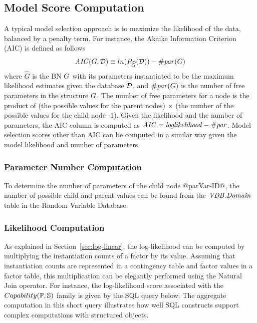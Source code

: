 \documentclass{IEEEtran}
\begin{document}
\subsection{Model Score Computation} \label{sec:model-score}
A typical model selection approach is to maximize the likelihood of the data, balanced by a penalty term. For instance, the Akaike Information Criterion (AIC) is defined as follows %
\[
\mathit{AIC}(\G,\D) \equiv ln(P_{\widehat{G}}(\D)) - \parameters(\G) \]
where $\widehat{G}$ is the BN $\G$ with its parameters instantiated to be the maximum likelihood estimates given the database $\D$, and $\parameters(\G)$ is the number of free parameters in the structure $\G$. 
The number of free parameters for a node is the product of (the possible values for the parent nodes) $\times$ (the number of the possible values for the child node -1). Given the likelihood and the number of parameters, the AIC column is computed as $\aic = \loglikelihood - \parameters$. 
 Model selection scores other than AIC can be computed in a similar way given the model likelihood and number of parameters.

\subsubsection{Parameter Number Computation} To determine the number of parameters of the child node @parVar-ID@, the number of possible child and parent values can be found from the $\it{\RVD.Domain}$ table in the Random Variable Database.  

\subsubsection{Likelihood Computation} As explained in Section~\ref{sec:log-linear}, the log-likelihood can be computed by multiplying the instantiation counts of a factor by its value. Assuming that instantiation counts are represented in a contingency table and factor values in a factor table, this multiplication can be elegantly performed using the Natural Join operator. For instance, the log-likelihood score associated with the $Capability(\P,\S)$ family is given by the SQL query below. The aggregate computation in this short query illustrates how well SQL constructs support complex computations with structured objects. 
\end{document}
